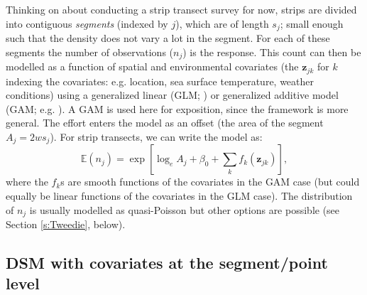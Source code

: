 \documentclass[a4paper,12pt]{article}
\begin{document}
Thinking on about conducting a strip transect survey for now, strips are divided into contiguous \textit{segments} (indexed by $j$), which are of length $s_j$; small enough such that the density does not vary a lot in the segment. For each of these segments the number of observations ($n_j$) is the response. This count can then be modelled as a function of spatial and environmental covariates (the $\mathbf{z}_{jk}$ for $k$ indexing the covariates: e.g. location, sea surface temperature, weather conditions) using a generalized linear (GLM; \cite{McCullagh:1989ux}) or generalized additive model (GAM; e.g. \cite{Wood:2006wz}). A GAM is used here for exposition, since the framework is more general. The effort enters the model as an offset (the area of the segment $A_j = 2ws_j$). For strip transects, we can write the model as:
\begin{equation}
\mathbb{E}(n_j) = \exp\left[ \log_e A_j + \beta_0 + \sum_k f_k\left(\bm{z}_{jk}\right) \right],
\label{e:stripgam}
\end{equation}
where the $f_k$s are smooth functions of the covariates in the GAM case (but could equally be linear functions of the covariates in the GLM case). The distribution of $n_j$ is usually modelled as quasi-Poisson but other options are possible (see Section \ref{s:Tweedie}, below).

\subsection*{DSM with covariates at the segment/point level}
\end{document}
